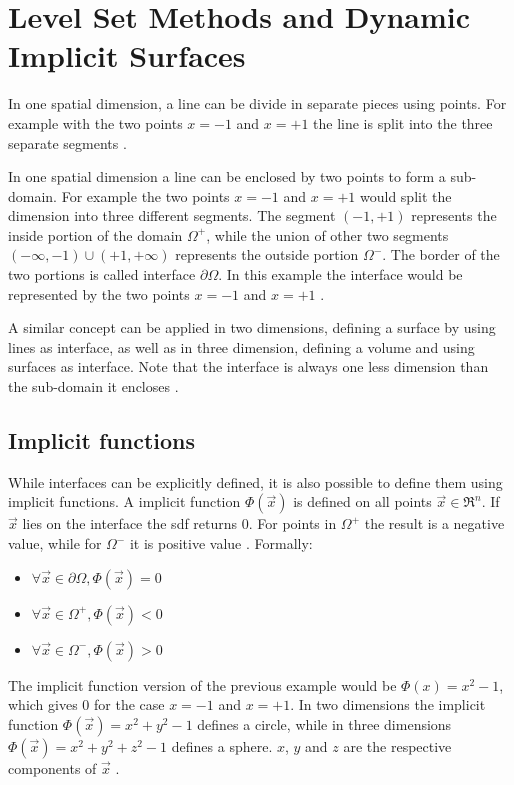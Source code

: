 \section{Level Set Methods and Dynamic Implicit Surfaces}

In one spatial dimension, a line can be divide in separate pieces using points. For example with the two points  $x = -1$ and $x = +1$ the line is split into the three separate segments \cite{osher:2006:level}
.

In one spatial dimension a line can be enclosed by two points to form a sub-domain. For example the two points $x = -1$ and $x = +1$ would split the dimension into three different segments. The segment $(-1, +1)$ represents the inside portion of the domain $\Omega^+$, while the union of other two segments  $(-\infty,-1) \cup (+1,+\infty) $ represents the outside portion $\Omega^-$. The border of the two portions is called interface  $\partial\Omega$. In this example the interface would be represented by the two points $x = -1$ and $x = +1$ \cite{osher:2006:level}
.

A similar concept can be applied in two dimensions, defining a surface by using lines as interface, as well as in three dimension, defining a volume and using surfaces as interface. Note that the interface is always one less dimension than the sub-domain it encloses \cite{osher:2006:level}
.

\subsection{Implicit functions}

While interfaces can be explicitly defined, it is also possible to define them using implicit functions. A implicit function $\Phi(\vec{x})$ is defined on all points $\vec{x} \in \Re^n$. If $\vec{x}$ lies on the interface the \gls{sdf} returns 0. For points in $\Omega^+$ the result is a negative value, while for $\Omega^-$ it is positive value \cite{osher:2006:level}. Formally:
\begin{itemize}
	\item $\forall \vec{x} \in \partial\Omega,  \Phi(\vec{x}) = 0$ 
	\item $\forall \vec{x} \in \Omega^+,  \Phi(\vec{x}) < 0$
	\item $\forall \vec{x} \in \Omega^-,  \Phi(\vec{x}) > 0$
\end{itemize}

The implicit function version of the previous example would be $\Phi(x) = x^2 - 1$, which gives 0 for the case $x = -1$ and $x = +1$.
In two dimensions the implicit function $\Phi(\vec{x}) = x^2 + y^2 - 1$ defines a circle, while in three dimensions  $\Phi(\vec{x}) = x^2 + y^2 + z^2 - 1$ defines a sphere. $x$, $y$ and $z$ are the respective components of $\vec{x}$ \cite{osher:2006:level}.


